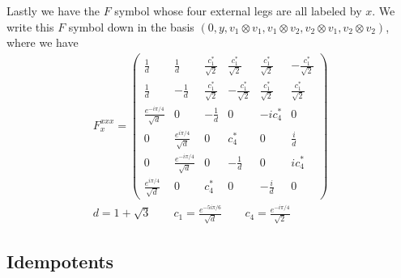 \documentclass[12pt,a4paper]{article}
\newcommand{\tp}{\otimes}
\newcommand{\dave}[1]{{\color{ao(english)}\footnotesize{(DA) #1}}}
\begin{document}
Lastly we have the $F$ symbol whose four external legs are all labeled by $x$.
We write this $F$ symbol down in the basis $(0,y, v_1\tp v_1,v_1 \tp v_2, v_2 \tp v_1, v_2 \tp v_2)$, where we have 
\begin{align}
F^{xxx}_x  = 
 \left(\begin{matrix}
\frac{1}{d} & \frac{1}{d} & \frac{c_1^*}{\sqrt{2}} & \frac{c_1^*}{\sqrt{2}} & \frac{c_1^*}{\sqrt{2}} & - \frac{c_1^*}{\sqrt{2}} \\
\frac{1}{d} & - \frac{1}{d} & \frac{c_1^*}{\sqrt{2}} & -\frac{c_1^*}{\sqrt{2}} & \frac{c_1^*}{\sqrt{2}} & \frac{c_1^*}{\sqrt{2}} \\
\frac{e^{- i \pi/4}}{\sqrt{d}} & 0 & -\frac{1}{d} & 0 & -i c_4^* & 0 \\
0 & \frac{e^{i \pi /4}}{\sqrt{d}} & 0 &c_4^* & 0 & \frac{ i}{d} \\
0 & \frac{e^{- i \pi /4}}{\sqrt{d}} & 0 & -\frac{1}{d} & 0 & i c_4^* \\ 
\frac{e^{i \pi /4}}{\sqrt{d}} & 0 & c_4^* & 0 & - \frac{i}{d} & 0
\end{matrix} \right) \\
d = 1 + \sqrt{3} \quad \quad c_1 = \frac{e^{-5 i \pi/6} }{\sqrt{d}} \quad \quad c_4 = \frac{e^{-i \pi/4}}{\sqrt{2}}
\end{align}

\newpage
\subsection{Idempotents}
\label{IdempotentsHalfESix}
\end{document}
